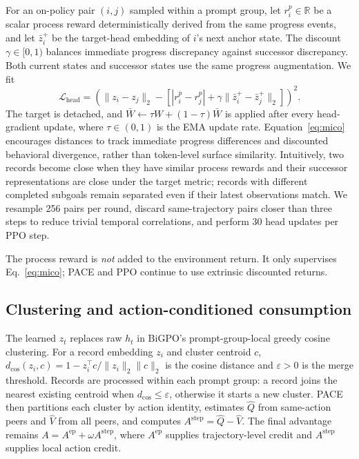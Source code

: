 \documentclass[10pt,twocolumn,letterpaper]{article}
\newcommand{\Aepisode}{A^{\mathrm{ep}}}
\newcommand{\Astep}{A^{\mathrm{step}}}
\begin{document}
For an on-policy pair $(i,j)$ sampled within a prompt group, let $r_i^p\in\mathbb R$ be a scalar process reward deterministically derived from the same progress events, and let $\bar z_i^{+}$ be the target-head embedding of $i$'s next anchor state. The discount $\gamma\in[0,1)$ balances immediate progress discrepancy against successor discrepancy. Both current states and successor states use the same progress augmentation. We fit
\begin{equation}
\mathcal L_{\mathrm{head}}=
\left(\|z_i-z_j\|_2-
\left[|r_i^p-r_j^p|+\gamma\|\bar z_i^{+}-\bar z_j^{+}\|_2\right]\right)^2.
\label{eq:mico}
\end{equation}
The target is detached, and $\bar W\leftarrow\tau W+(1-\tau)\bar W$ is applied after every head-gradient update, where $\tau\in(0,1)$ is the EMA update rate. Equation~\ref{eq:mico} encourages distances to track immediate progress differences and discounted behavioral divergence, rather than token-level surface similarity. Intuitively, two records become close when they have similar process rewards and their successor representations are close under the target metric; records with different completed subgoals remain separated even if their latest observations match. We resample 256 pairs per round, discard same-trajectory pairs closer than three steps to reduce trivial temporal correlations, and perform 30 head updates per PPO step.

The process reward is \emph{not} added to the environment return. It only supervises Eq.~\ref{eq:mico}; PACE and PPO continue to use extrinsic discounted returns.

\subsection{Clustering and action-conditioned consumption}
The learned $z_t$ replaces raw $h_t$ in BiGPO's prompt-group-local greedy cosine clustering. For a record embedding $z_i$ and cluster centroid $c$, $d_{\cos}(z_i,c)=1-z_i^\top c/\|z_i\|_2\|c\|_2$ is the cosine distance and $\varepsilon>0$ is the merge threshold. Records are processed within each prompt group: a record joins the nearest existing centroid when $d_{\cos}\leq\varepsilon$, otherwise it starts a new cluster. PACE then partitions each cluster by action identity, estimates $\hat Q$ from same-action peers and $\hat V$ from all peers, and computes $\Astep=\hat Q-\hat V$. The final advantage remains $A=\Aepisode+\omega\Astep$, where $\Aepisode$ supplies trajectory-level credit and $\Astep$ supplies local action credit.
\end{document}
